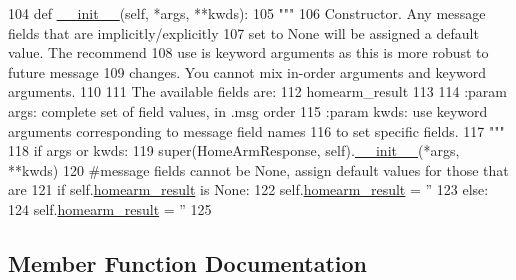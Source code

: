 \begin{DoxyCode}
104   \textcolor{keyword}{def }\hyperlink{classjaco__msgs_1_1srv_1_1__HomeArm_1_1HomeArmResponse_a6ab8f75e14296cfdb4b3ba162908a46a}{\_\_init\_\_}(self, *args, **kwds):
105     \textcolor{stringliteral}{"""}
106 \textcolor{stringliteral}{    Constructor. Any message fields that are implicitly/explicitly}
107 \textcolor{stringliteral}{    set to None will be assigned a default value. The recommend}
108 \textcolor{stringliteral}{    use is keyword arguments as this is more robust to future message}
109 \textcolor{stringliteral}{    changes.  You cannot mix in-order arguments and keyword arguments.}
110 \textcolor{stringliteral}{}
111 \textcolor{stringliteral}{    The available fields are:}
112 \textcolor{stringliteral}{       homearm\_result}
113 \textcolor{stringliteral}{}
114 \textcolor{stringliteral}{    :param args: complete set of field values, in .msg order}
115 \textcolor{stringliteral}{    :param kwds: use keyword arguments corresponding to message field names}
116 \textcolor{stringliteral}{    to set specific fields.}
117 \textcolor{stringliteral}{    """}
118     \textcolor{keywordflow}{if} args \textcolor{keywordflow}{or} kwds:
119       super(HomeArmResponse, self).\hyperlink{classjaco__msgs_1_1srv_1_1__HomeArm_1_1HomeArmResponse_a6ab8f75e14296cfdb4b3ba162908a46a}{\_\_init\_\_}(*args, **kwds)
120       \textcolor{comment}{#message fields cannot be None, assign default values for those that are}
121       \textcolor{keywordflow}{if} self.\hyperlink{classjaco__msgs_1_1srv_1_1__HomeArm_1_1HomeArmResponse_ab8f752cc7b9a50d887ea43e81ac6da6b}{homearm\_result} \textcolor{keywordflow}{is} \textcolor{keywordtype}{None}:
122         self.\hyperlink{classjaco__msgs_1_1srv_1_1__HomeArm_1_1HomeArmResponse_ab8f752cc7b9a50d887ea43e81ac6da6b}{homearm\_result} = \textcolor{stringliteral}{''}
123     \textcolor{keywordflow}{else}:
124       self.\hyperlink{classjaco__msgs_1_1srv_1_1__HomeArm_1_1HomeArmResponse_ab8f752cc7b9a50d887ea43e81ac6da6b}{homearm\_result} = \textcolor{stringliteral}{''}
125 
\end{DoxyCode}


\subsection{Member Function Documentation}

